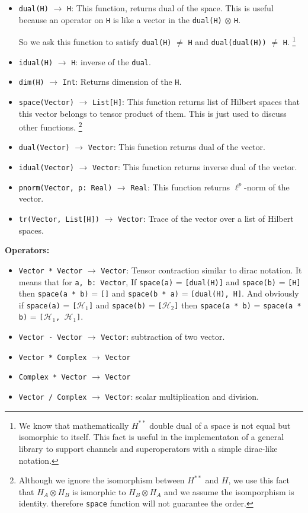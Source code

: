\documentclass[a4paper,11pt]{article}
\def\co{\lstinline}
\begin{document}
\begin{itemize}
	\item \co|dual(H)| \(\to\) \co|H|:
	    This function, returns dual of the space. This is useful because an operator on \co|H| is like a vector in the \co|dual(H)| \(\otimes\) \co|H|.

	    So we ask this function to satisfy \co|dual(H)| \(\ne\) \co|H| and \co|dual(dual(H))| \(\ne\) \co|H|.%
	    \footnote{We know that mathematically \(H^{**}\) double dual of a space is not equal but isomorphic to itself.
            This fact is useful in the implementaton of a general library to support channels and superoperators with a simple dirac-like notation.}
    \item \co|idual(H)| \(\to\) \co|H|:
        inverse of the \co|dual|.
    \item \co|dim(H)| \(\to\) \co|Int|:
        Returns dimension of the \co|H|.
    \item \co|space(Vector)| \(\to\) \co|List[H]|:
        This function returns list of Hilbert spaces that this vector belongs to tensor product of them.
        This is just used to discuss other functions.%
        \footnote{Although we ignore the isomorphism between \(H^{**}\) and \(H\), we use this fact that $H_A \otimes H_B$ is ismorphic to $H_B \otimes H_A$ and we assume the isomporphism is identity. therefore \co|space| function will not guarantee the order.}
	\item \co|dual(Vector)| \(\to\) \co|Vector|:
	    This function returns dual of the vector.
	\item \co|idual(Vector)| \(\to\) \co|Vector|:
	    This function returns inverse dual of the vector.
	\item \co|pnorm(Vector, p: Real)| \(\to\) \co|Real|:
	    This function returns $\ell^p$-norm of the vector.
	\item \co|tr(Vector, List[H])| \(\to\) \co|Vector|:
	    Trace of the vector over a list of Hilbert spaces.
\end{itemize}

\textbf{Operators: }

\begin{itemize}
    \item \co|Vector * Vector| \(\to\) \co|Vector|:
	    Tensor contraction similar to dirac notation. It means that for \co|a, b: Vector|,
	    If \co|space(a)| = \co|[dual(H)]| and \co|space(b)| = \co|[H]| then \co|space(a * b)| = \co|[]| and \co|space(b * a)| = \co|[dual(H), H]|. And obviously if \co|space(a)| = \co|[|\(\mathcal{H}_1\)\co|]|  and \co|space(b)| = \co|[|\(\mathcal{H}_2\)\co|]|
	    then \co|space(a * b)| = \co|space(a * b)| = \co|[|\(\mathcal{H}_1\)\co|, |\(\mathcal{H}_1\)\co|]|.
	\item \co|Vector - Vector| \(\to\) \co|Vector|: subtraction of two vector.
    \item \co|Vector * Complex| \(\to\) \co|Vector|
    \item \co|Complex * Vector| \(\to\) \co|Vector|
    \item \co|Vector / Complex| \(\to\) \co|Vector|: scalar multiplication and division.

\end{itemize}
\end{document}
